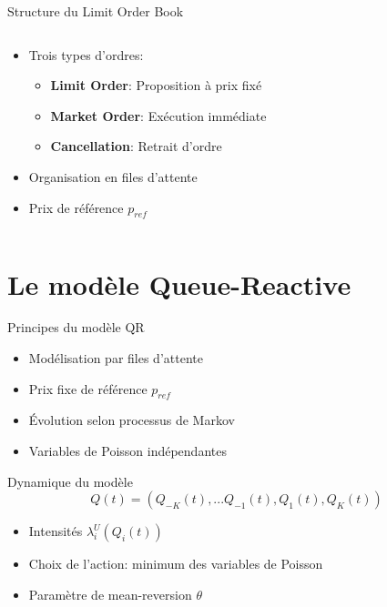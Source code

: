 \documentclass[aspectratio=169]{beamer}  %
\begin{document}
\begin{frame}{Structure du Limit Order Book}
    \begin{columns}
        \begin{column}{0.6\textwidth}
            \begin{itemize}
                \item Trois types d'ordres:
                \begin{itemize}
                    \item \textbf{Limit Order}: Proposition à prix fixé
                    \item \textbf{Market Order}: Exécution immédiate
                    \item \textbf{Cancellation}: Retrait d'ordre
                \end{itemize}
                \item Organisation en files d'attente
                \item Prix de référence $p_{ref}$
            \end{itemize}
        \end{column}
        \begin{column}{0.4\textwidth}
        \end{column}
    \end{columns}
\end{frame}

\section{Le modèle Queue-Reactive}

\begin{frame}{Principes du modèle QR}
    \begin{itemize}
        \item Modélisation par files d'attente
        \item Prix fixe de référence $p_{ref}$
        \item Évolution selon processus de Markov
        \item Variables de Poisson indépendantes
    \end{itemize}
\end{frame}

\begin{frame}{Dynamique du modèle}
    \begin{equation*}
        Q(t) = (Q_{-K}(t),...Q_{-1}(t),Q_{1}(t),Q_K(t))
    \end{equation*}
    \begin{itemize}
        \item Intensités $\lambda_i^U(Q_i(t))$
        \item Choix de l'action: minimum des variables de Poisson
        \item Paramètre de mean-reversion $\theta$
    \end{itemize}
\end{frame}
\end{document}
